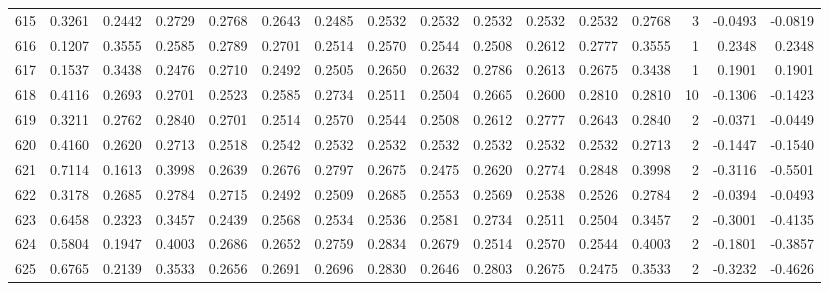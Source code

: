 \begin{tabular}{lrrrrrrrrrrrrrrr}
615 &      0.3261 &  0.2442 &  0.2729 &  0.2768 &  0.2643 &  0.2485 &  0.2532 &  0.2532 &  0.2532 &  0.2532 &   0.2532 &     0.2768 &      3 &                   -0.0493 &                    -0.0819 \\
616 &      0.1207 &  0.3555 &  0.2585 &  0.2789 &  0.2701 &  0.2514 &  0.2570 &  0.2544 &  0.2508 &  0.2612 &   0.2777 &     0.3555 &      1 &                    0.2348 &                     0.2348 \\
617 &      0.1537 &  0.3438 &  0.2476 &  0.2710 &  0.2492 &  0.2505 &  0.2650 &  0.2632 &  0.2786 &  0.2613 &   0.2675 &     0.3438 &      1 &                    0.1901 &                     0.1901 \\
618 &      0.4116 &  0.2693 &  0.2701 &  0.2523 &  0.2585 &  0.2734 &  0.2511 &  0.2504 &  0.2665 &  0.2600 &   0.2810 &     0.2810 &     10 &                   -0.1306 &                    -0.1423 \\
619 &      0.3211 &  0.2762 &  0.2840 &  0.2701 &  0.2514 &  0.2570 &  0.2544 &  0.2508 &  0.2612 &  0.2777 &   0.2643 &     0.2840 &      2 &                   -0.0371 &                    -0.0449 \\
620 &      0.4160 &  0.2620 &  0.2713 &  0.2518 &  0.2542 &  0.2532 &  0.2532 &  0.2532 &  0.2532 &  0.2532 &   0.2532 &     0.2713 &      2 &                   -0.1447 &                    -0.1540 \\
621 &      0.7114 &  0.1613 &  0.3998 &  0.2639 &  0.2676 &  0.2797 &  0.2675 &  0.2475 &  0.2620 &  0.2774 &   0.2848 &     0.3998 &      2 &                   -0.3116 &                    -0.5501 \\
622 &      0.3178 &  0.2685 &  0.2784 &  0.2715 &  0.2492 &  0.2509 &  0.2685 &  0.2553 &  0.2569 &  0.2538 &   0.2526 &     0.2784 &      2 &                   -0.0394 &                    -0.0493 \\
623 &      0.6458 &  0.2323 &  0.3457 &  0.2439 &  0.2568 &  0.2534 &  0.2536 &  0.2581 &  0.2734 &  0.2511 &   0.2504 &     0.3457 &      2 &                   -0.3001 &                    -0.4135 \\
624 &      0.5804 &  0.1947 &  0.4003 &  0.2686 &  0.2652 &  0.2759 &  0.2834 &  0.2679 &  0.2514 &  0.2570 &   0.2544 &     0.4003 &      2 &                   -0.1801 &                    -0.3857 \\
625 &      0.6765 &  0.2139 &  0.3533 &  0.2656 &  0.2691 &  0.2696 &  0.2830 &  0.2646 &  0.2803 &  0.2675 &   0.2475 &     0.3533 &      2 &                   -0.3232 &                    -0.4626 \\

\end{tabular}
